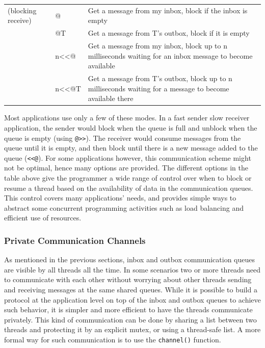 \begin{flushleft}
\begin{supertabular}{m{0.8920598in}m{0.8643598in}m{4.10186in}}
\centering (blocking receive) &
\centering {\textless}{\textless}@ &
Get a message from my inbox, block if the inbox is empty\\
 &
\centering {\textless}{\textless}@T &
Get a message from T{\textquoteright}s outbox, block if
it is empty\\
 &
\centering n{\textless}{\textless}@ &
Get a message from my inbox, block up to n milliseconds
waiting for an inbox message to become available\\
 &
\centering n{\textless}{\textless}@T &
Get a message from T{\textquoteright}s outbox, block up to n
milliseconds waiting for a message to become available there\\
\end{supertabular}
\end{flushleft}

\bigskip

Most applications use only a few of these modes. In a fast sender slow receiver
application, the sender would block when the queue is full
and unblock when the queue is empty (using
\texttt{@{\textgreater}{\textgreater}}). The receiver
would consume messages from the queue until it
is empty, and then block until there is a new message added to
the queue (\texttt{{\textless}{\textless}@}). For some
applications however, this communication scheme might not be optimal,
hence many options are provided. The different options in the table
above give the programmer a wide range of control over when to block or
resume a thread based on the availability of data in the communication
queues. This control covers many applications{\textquoteright} needs,
and provides simple ways to abstract some concurrent programming
activities such as load balancing and efficient use of resources.

\subsubsection{Private Communication Channels }

As mentioned in the previous sections, inbox and outbox communication
queues are visible by all threads all the time. In some scenarios two
or more threads need to communicate with each other without worrying
about other threads sending and receiving messages at the same shared
queues. While it is possible to build a protocol at the application
level on top of the inbox and outbox queues to achieve such behavior,
it is simpler and more efficient to have the threads communicate
privately. This kind of communication can be done by sharing a list
between two threads and protecting it by an explicit mutex, or using a
thread-safe list. A more formal way for such communication is to use
the \texttt{channel()} function. 

